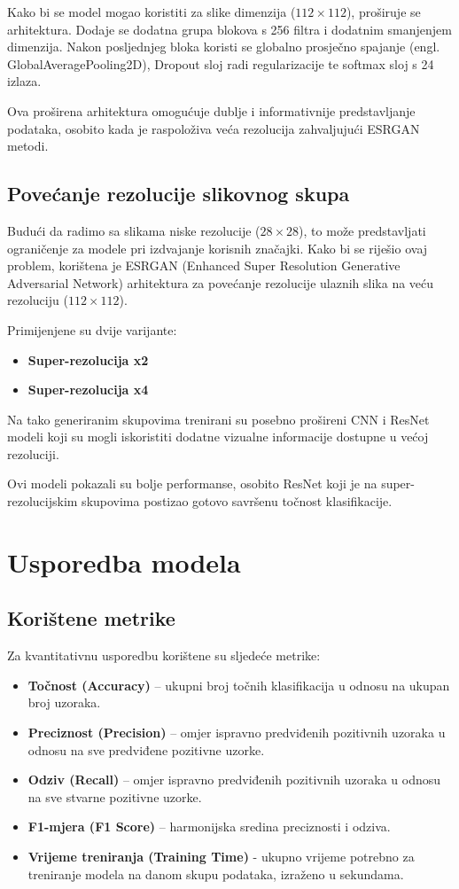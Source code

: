\documentclass[a4paper,twocolumn]{article}
\begin{document}
Kako bi se model mogao koristiti za slike dimenzija ($112 \times 112$), proširuje se arhitektura. Dodaje se dodatna grupa blokova s 256 filtra i dodatnim smanjenjem dimenzija. Nakon posljednjeg bloka koristi se globalno prosječno spajanje (engl. GlobalAveragePooling2D), Dropout sloj radi regularizacije te softmax sloj s 24 izlaza.

Ova proširena arhitektura omogućuje dublje i informativnije predstavljanje podataka, osobito kada je raspoloživa veća rezolucija zahvaljujući ESRGAN metodi.

\subsection{Povećanje rezolucije slikovnog skupa}

Budući da radimo sa slikama niske rezolucije ($28 \times 28$), to može predstavljati ograničenje za modele pri izdvajanje korisnih značajki. Kako bi se riješio ovaj problem, korištena je ESRGAN (Enhanced Super Resolution Generative Adversarial Network) arhitektura za povećanje rezolucije ulaznih slika na veću rezoluciju ($112 \times 112$).

Primijenjene su dvije varijante:
\begin{itemize}
\item \textbf{Super-rezolucija x2}
\item \textbf{Super-rezolucija x4}
\end{itemize}

Na tako generiranim skupovima trenirani su posebno prošireni CNN i ResNet modeli koji su mogli iskoristiti dodatne vizualne informacije dostupne u većoj rezoluciji.

Ovi modeli pokazali su bolje performanse, osobito ResNet koji je na super-rezolucijskim skupovima postizao gotovo savršenu točnost klasifikacije.

\section{Usporedba modela}

\subsection{Korištene metrike}

Za kvantitativnu usporedbu korištene su sljedeće metrike:
\begin{itemize}
    \item \textbf{Točnost (Accuracy)} – ukupni broj točnih klasifikacija u odnosu na ukupan broj uzoraka.
    \item \textbf{Preciznost (Precision)} – omjer ispravno predviđenih pozitivnih uzoraka u odnosu na sve predviđene pozitivne uzorke.
    \item \textbf{Odziv (Recall)} – omjer ispravno predviđenih pozitivnih uzoraka u odnosu na sve stvarne pozitivne uzorke.
    \item \textbf{F1-mjera (F1 Score)} – harmonijska sredina preciznosti i odziva.
    \item \textbf{Vrijeme treniranja (Training Time)} - ukupno vrijeme potrebno za treniranje modela na danom skupu podataka, izraženo u sekundama.
\end{itemize}
\end{document}
